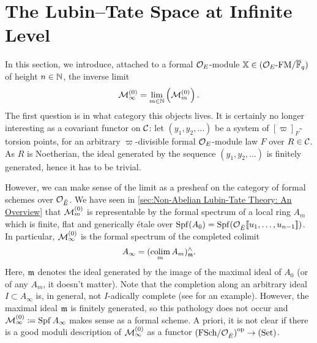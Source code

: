 \documentclass[../main.tex]{subfiles}
\begin{document}
\section{The Lubin--Tate Space at Infinite Level}
\label{sec:The Lubin--Tate Space at Infinite Level}

In this section, we introduce, attached to a formal $\mathcal{O}_E$-module
$\mathbb{X} \in {({\mathcal{O}_E}\textnormal-\allowbreak\mathrm{FM}/{{\overline{\mathbb{F}}_q}})}$ of height $n \in \mathbb{N}$, the inverse limit
\begin{equation*}
  \mathcal{M}_{\infty}^{(0)} = \lim_{m \in \mathbb{N}} \left(\mathcal{M}_{m}^{(0)}\right).
\end{equation*}
The first question is in what category this objects lives. It is
certainly no longer interesting as a covariant functor on $\mathcal{C}$: let $(y_1,
y_2, \dots)$ be a system of $[\varpi]_F$-torsion points,
for an arbitrary $\varpi$-divisible formal $\mathcal{O}_E$-module law $F$ over
$R \in \mathcal{C}$. As $R$ is Noetherian, the ideal generated by the sequence $(y_1,
y_2, \dots)$ is finitely generated, hence it has to be trivial.

However, we can make sense of the limit as a presheaf on the category of formal
schemes over $\mathcal{O}_{\breve {E}}$. We have seen in \cref{sec:Non-Abelian Lubin-Tate
Theory: An Overview} that $\mathcal{M}_{m}^{(0)}$ is 
representable by the formal spectrum of a local ring $A_m$ which
is finite, flat and generically \'etale
over $\operatorname{Spf}(A_0) = \operatorname{Spf}(\mathcal{O}_{{\breve {E}}}\llbracket u_1, \dots, u_{n-1}\rrbracket)$. In particular,
$\mathcal{M}_{\infty}^{(0)}$ is the formal spectrum of the completed colimit 
\begin{equation*}
  A_\infty = (\operatorname*{colim}_m A_m)^\wedge_{\mathfrak{m}}.
\end{equation*}
Here, $\mathfrak{m}$ denotes the ideal generated by the image of the maximal ideal of
$A_0$ (or of any $A_m$, it doesn't matter). 
Note that the completion along an arbitrary ideal $I \subset A_\infty$ is, in
general, not $I$-adically complete (see
\cite[\href{https://stacks.math.columbia.edu/tag/05JA}{Tag
05JA}]{stacks-project} for an example). However, the maximal ideal $\mathfrak{m}$ is
finitely generated, so this pathology does not occur and $\mathcal{M}_\infty^{(0)}
\coloneqq \operatorname{Spf} A_\infty$ makes sense as a formal scheme. A priori, it is not
clear if there is a good moduli description of $\mathcal{M}_\infty^{(0)}$ as a functor
${(\mathrm{FSch}/{\mathcal{O}_{\breve {E}}})}^{{\mathrm{op}}} \to {(\mathrm{Set})}$.
\end{document}
